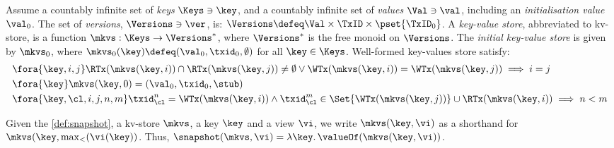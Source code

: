 \begin{definition}
\label{def:mkvs-appendix}
Assume a countably infinite set of \emph{keys} $\Keys \ni \key$, 
and a countably infinite set of  \emph{values} $\Val \ni \val$, 
including an \emph{initialisation value} $\val_0 $.
The set of \emph{versions}, $\Versions \ni \ver$, is: $\Versions \defeq \Val \times \TxID \times \pset{\TxID_{0}}$. 
A \emph{key-value store}, abbreviated to kv-store,  is a function $\mkvs: \Keys \rightarrow \Versions^{\ast}$, 
where $\Versions^{\ast}$ is the free monoid on $\Versions$. 
The \emph{initial key-value store} is given by $\mkvs_0$, where 
$\mkvs_{0}(\key)\defeq  (\val_0, \txid_0, \emptyset)$ for
all $\key \in \Keys$.
Well-formed key-values store satisfy:
\begin{align}
& \fora{\key, i, j} 
\RTx(\mkvs(\key, i)) \cap \RTx(\mkvs(\key, j)) \neq \emptyset \lor
\WTx(\mkvs(\key, i)) = \WTx(\mkvs(\key, j))
\implies i = j  \\
& \fora{\key} \mkvs(\key, 0) = (\val_0, \txid_0, \stub) \\
& \fora{ \key, \cl, i,j, n, m} 
\txid_{\cl}^{n} = \WTx(\mkvs(\key,i)) \wedge \txid_{\cl}^{m} \in
\Set{\WTx(\mkvs(\key,j))} \cup \RTx(\mkvs(\key, i)) \implies n < m
\end{align}
\end{definition}

Given the \cref{def:snapshot}, 
a kv-store $\mkvs$, a key $\key$ and a view $\vi$, 
we write $\mkvs(\key, \vi)$ as a shorthand for 
$\mkvs(\key, \max_{<}(\vi(\key))$. Thus, $\snapshot(\mkvs, \vi) = \lambda \key \ldotp \valueOf(\mkvs(\key, \vi))$. 
